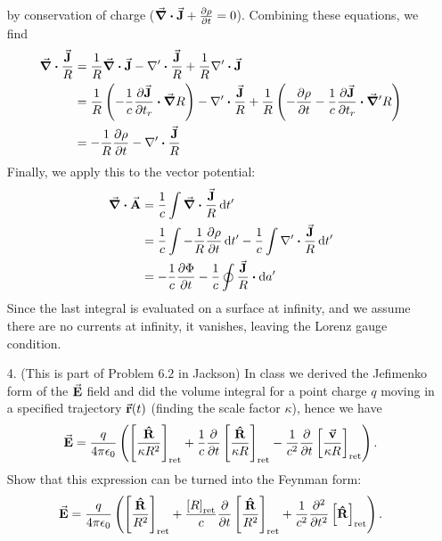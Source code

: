 \documentclass[a4paper,twoside]{article}
\begin{document}
\begin{itemize}
\begin{problem}
\begin{equation}
            \end{equation}
            by conservation of charge ($ \div{ \va{J}} + \pdv{\rho}{t} = 0 $). Combining these equations, we find
            \begin{align}
                \div{\frac{ \va{J}}{R}} &= \frac{1}{R} \div{ \va{J}} - \nabla' \vdot \frac{ \va{J}}{R} + \frac{1}{R} \nabla' \vdot \va{J} \\
                &= \frac{1}{R} \left( - \frac{1}{c} \pdv{ \va{J}}{t_r} \vdot \grad{R} \right) - \nabla' \vdot \frac{ \va{J}}{R} + \frac{1}{R} \left( - \pdv{\rho}{t} - \frac{1}{c} \pdv{ \va{J}}{t_r} \vdot \grad'{R} \right) \\
                &= - \frac{1}{R} \pdv{\rho}{t} - \nabla' \vdot \frac{ \va{J}}{R}
            \end{align}
            Finally, we apply this to the vector potential:
            \begin{align}
                \div{ \va{A}} &= \frac{1}{c} \int \div{\frac{ \va{J}}{R}} \dd{t'} \\
                &= \frac{1}{c} \int - \frac{1}{R} \pdv{\rho}{t} \dd{t'} - \frac{1}{c} \int \nabla' \vdot \frac{ \va{J}}{R} \dd{t'} \\
                &= - \frac{1}{c} \pdv{\Phi}{t} - \frac{1}{c} \oint \frac{ \va{J}}{R} \vdot \dd{a'}
            \end{align}
            Since the last integral is evaluated on a surface at infinity, and we assume there are no currents at infinity, it vanishes, leaving the Lorenz gauge condition.
        \end{problem}
    \item[4.] (This is part of Problem $ 6.2 $ in Jackson) In class we derived the Jefimenko form of the $ \va{E} $ field and did the volume integral for a point charge $ q $ moving in a specified trajectory $ \va{r}(t) $  (finding the scale factor $ \kappa $), hence we have
        \begin{equation}
            \va{E} = \frac{q}{4 \pi \epsilon_0} \left( \left[ \frac{ \vu{R}}{\kappa R^2} \right]_{\text{ret}} + \frac{1}{c} \pdv{t} \left[ \frac{ \vu{R}}{\kappa R} \right]_{\text{ret}} - \frac{1}{c^2} \pdv{t} \left[ \frac{ \va{v}}{\kappa R} \right]_{\text{ret}} \right).
        \end{equation}
        Show that this expression can be turned into the Feynman form:
        \begin{equation}
            \va{E} = \frac{q}{4 \pi \epsilon_0} \left( \left[ \frac{ \vu{R}}{R^2} \right]_{\text{ret}} + \frac{\left[ R \right]_{\text{ret}}}{c} \pdv{t}\left[ \frac{ \vu{R}}{R^2} \right]_{\text{ret}} + \frac{1}{c^2} \pdv[2]{t} \left[ \vu{R} \right]_{\text{ret}} \right).

\end{equation}
\end{itemize}
\end{document}
